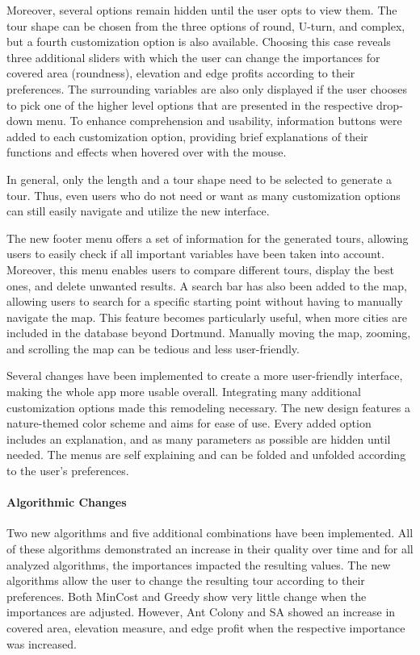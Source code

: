 Moreover, several options remain hidden until the user opts to view them. 
The tour shape can be chosen from the three options of round, U-turn, and complex, but a fourth customization option is also available.
Choosing this case reveals three additional sliders with which the user can change the importances for covered area (roundness), elevation and edge profits according to their preferences.
The surrounding variables are also only displayed if the user chooses to pick one of the higher level options that are presented in the respective drop-down menu.
To enhance comprehension and usability, information buttons were added to each customization option, providing brief explanations of their functions and effects when hovered over with the mouse.

In general, only the length and a tour shape need to be selected to generate a tour.
Thus, even users who do not need or want as many customization options can still easily navigate and utilize the new interface.


The new footer menu offers a set of information for the generated tours, allowing users to easily check if all important variables have been taken into account. 
Moreover, this menu enables users to compare different tours, display the best ones, and delete unwanted results.
A search bar has also been added to the map, allowing users to search for a specific starting point without having to manually navigate the map.
This feature becomes particularly useful, when more cities are included in the database beyond Dortmund.
Manually moving the map, zooming, and scrolling the map can be tedious and less user-friendly.


Several changes have been implemented to create a more user-friendly interface, making the whole app more usable overall.
Integrating many additional customization options made this remodeling necessary.
The new design features a nature-themed color scheme and aims for ease of use.
Every added option includes an explanation, and as many parameters as possible are hidden until needed.
The menus are self explaining and can be folded and unfolded according to the user's preferences.


\paragraph{Algorithmic Changes}

Two new algorithms and five additional combinations have been implemented.
All of these algorithms demonstrated an increase in their quality over time and for all analyzed algorithms, the importances impacted the resulting values.
The new algorithms allow the user to change the resulting tour according to their preferences.
Both MinCost and Greedy show very little change when the importances are adjusted.
However, Ant Colony and SA showed an increase in covered area, elevation measure, and edge profit when the respective importance was increased.

